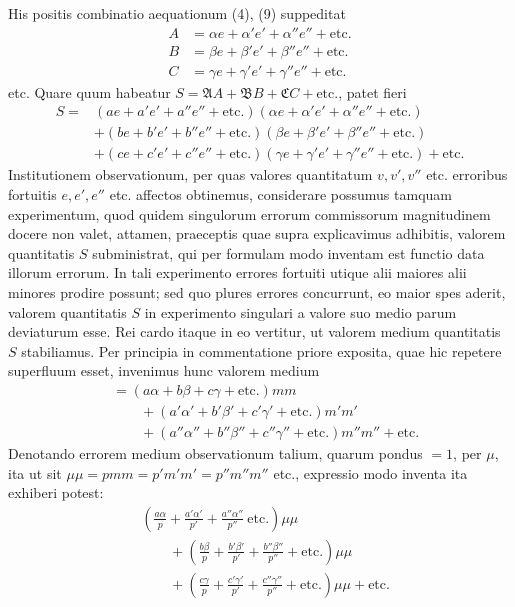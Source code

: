 His positis combinatio aequationum (4), (9) suppeditat
\[
\begin{aligned}
A&=\alpha e+\alpha'e'+\alpha''e''+\text{etc.}\\
B&=\beta e+\beta'e'+\beta''e''+\text{etc.}\\
C&=\gamma e+\gamma'e'+\gamma''e''+\text{etc.}
\end{aligned}
\]
etc. Quare quum habeatur \(S=\mathfrak A A+\mathfrak B B+\mathfrak C C+\text{etc.}\), patet fieri
\[
\begin{aligned}
S={}&(ae+a'e'+a''e''+\text{etc.})(\alpha e+\alpha'e'+\alpha''e''+\text{etc.})\\
&+(be+b'e'+b''e''+\text{etc.})(\beta e+\beta'e'+\beta''e''+\text{etc.})\\
&+(ce+c'e'+c''e''+\text{etc.})(\gamma e+\gamma'e'+\gamma''e''+\text{etc.})+\text{etc.}
\end{aligned}
\]
Institutionem observationum, per quas valores quantitatum \(v,v',v''\) etc. erroribus fortuitis \(e,e',e''\) etc. affectos obtinemus, considerare possumus tamquam
experimentum, quod quidem singulorum errorum commissorum magnitudinem docere non valet, attamen, praeceptis quae supra explicavimus adhibitis, valorem quantitatis \(S\) subministrat, qui per formulam modo inventam est functio data illorum errorum. In tali experimento errores fortuiti utique alii maiores alii minores prodire possunt; sed quo plures errores concurrunt, eo maior spes aderit, valorem quantitatis \(S\) in experimento singulari a valore suo medio parum deviaturum esse. Rei cardo itaque in eo vertitur, ut valorem medium quantitatis \(S\) stabiliamus. Per principia in commentatione priore exposita, quae hic repetere superfluum esset, invenimus hunc valorem medium
\[
\begin{aligned}
&=(a\alpha+b\beta+c\gamma+\text{etc.})mm\\&\qquad+(a'\alpha'+b'\beta'+c'\gamma'+\text{etc.})m'm'\\
&\qquad+(a''\alpha''+b''\beta''+c''\gamma''+\text{etc.})m''m''+\text{etc.}
\end{aligned}
\]
Denotando errorem medium observationum talium, quarum pondus \(=1\), per \(\mu\), ita ut sit \(\mu\mu=pmm=p'm'm'=p''m''m''\) etc., expressio modo inventa ita exhiberi potest:
\[
\begin{aligned}
&\left(\frac{a\alpha}{p}+\frac{a'\alpha'}{p'}+\frac{a''\alpha''}{p''}\ \text{etc.}\right)\mu\mu
\\&\qquad+\left(\frac{b\beta}{p}+\frac{b'\beta'}{p'}+\frac{b''\beta''}{p''}+\text{etc.}\right)\mu\mu\\
&\qquad+\left(\frac{c\gamma}{p}+\frac{c'\gamma'}{p'}+\frac{c''\gamma''}{p''}+\text{etc.}\right)\mu\mu+\text{etc.}
\end{aligned}
\]
